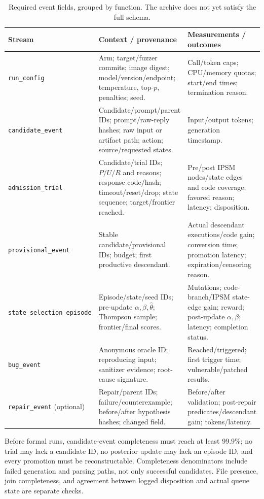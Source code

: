 \documentclass[final,5p,times,number]{elsarticle}
\begin{document}
\begin{table}[!tbp]
\centering\footnotesize
\caption{Required event fields, grouped by function. The archive does not yet satisfy the full schema.}
\label{tab:events}
\begin{tabularx}{\textwidth}{@{}>{\raggedright\arraybackslash}p{} Y Y@{}}
\toprule
Stream & Context / provenance & Measurements / outcomes \\
\midrule
\texttt{run\_config} & Arm; target/fuzzer commits; image digest; model/version/endpoint; temperature, top-$p$, penalties; seed. & Call/token caps; CPU/memory quotas; start/end times; termination reason. \\
\texttt{candidate\_event} & Candidate/prompt/parent IDs; prompt/raw-reply hashes; raw input or artifact path; action; source/requested states. & Input/output tokens; generation timestamp. \\
\texttt{admission\_trial} & Candidate/trial IDs; $P/U/R$ and reasons; response code/hash; timeout/reset/drop; state sequence; target/frontier reached. & Pre/post IPSM nodes/state edges and code coverage; favored reason; latency; disposition. \\
\texttt{provisional\_event} & Stable candidate/provisional IDs; budget; first productive descendant. & Actual descendant executions/code gain; conversion time; promotion latency; expiration/censoring reason. \\
\texttt{state\_selection\_episode} & Episode/state/seed IDs; pre-update $\alpha,\beta,\widehat{\theta}$; Thompson sample; frontier/final scores. & Mutations; code-branch/IPSM state-edge gain; reward; post-update $\alpha,\beta$; latency; completion status. \\
\texttt{bug\_event} & Anonymous oracle ID; reproducing input; sanitizer evidence; root-cause signature. & Reached/triggered; first trigger time; vulnerable/patched results. \\
\texttt{repair\_event} (optional) & Repair/parent IDs; failure/counterexample; before/after hypothesis hashes; changed field. & Before/after validation; post-repair predicates/descendant gain; tokens/latency. \\
\bottomrule
\end{tabularx}
\end{table}

Before formal runs, candidate-event completeness must reach at least 99.9\%; no trial may lack a candidate ID, no posterior update may lack an episode ID, and every promotion must be reconstructable. Completeness denominators include failed generation and parsing paths, not only successful candidates. File presence, join completeness, and agreement between logged disposition and actual queue state are separate checks.
\end{document}
